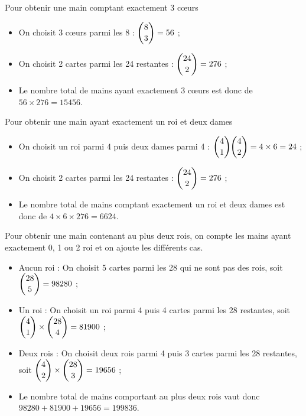 \documentclass[11pt,fleqn, openany]{book} %
\begin{document}
\begin{solution}Pour obtenir une main comptant exactement 3 cœurs
\begin{itemize}
\item On choisit 3 cœurs parmi les 8 : $\dbinom{8}{3}=56$ ;
\item On choisit 2 cartes parmi les 24 restantes : $\dbinom{24}{2}=276$ ;
\item Le nombre total de mains ayant exactement 3 cœurs est donc de $56 \times 276 = 	15456$.
\end{itemize}

Pour obtenir une main ayant exactement un roi et deux dames
\begin{itemize}
\item On choisit un roi parmi 4 puis deux dames parmi 4 : $\dbinom{4}{1} \dbinom{4}{2}=4 \times 6 = 24$ ;
\item On choisit 2 cartes parmi les 24 restantes : $\dbinom{24}{2}=276$ ;
\item Le nombre total de mains comptant exactement un roi et deux dames est donc de $4 \times 6 \times 276=6624$.\end{itemize}

Pour obtenir une main contenant au plus deux rois, on compte les mains ayant exactement 0, 1 ou 2 roi et on ajoute les différents cas.
\begin{itemize}
\item Aucun roi : On choisit 5 cartes parmi les 28 qui ne sont pas des rois, soit $\dbinom{28}{5}=98280$ ;
\item Un roi : On choisit un roi parmi 4 puis 4 cartes parmi les 28 restantes, soit $\dbinom{4}{1} \times \dbinom{28}{4}=81900$ ;
\item Deux rois : On choisit deux rois parmi 4 puis 3 cartes parmi les 28 restantes, soit $\dbinom{4}{2} \times \dbinom{28}{3}=19656$ ;
\item Le nombre total de mains comportant au plus deux rois vaut donc $98280+81900+19656=199836$.
\end{itemize}\end{solution}





%
%
\end{document}
